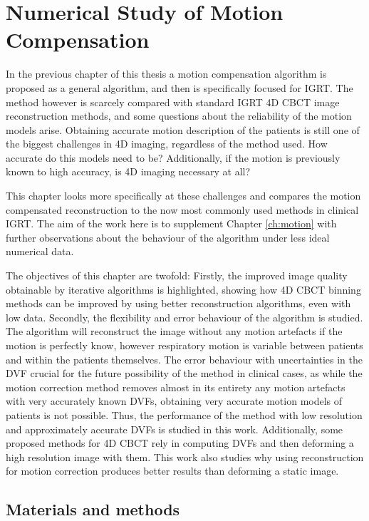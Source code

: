 \chapter{Numerical Study of Motion Compensation}


In the previous chapter of this thesis a motion compensation algorithm is proposed as a general algorithm, and then is specifically focused for IGRT. The method however is scarcely compared with standard IGRT 4D CBCT image reconstruction methods, and some questions about the reliability of the motion models arise. Obtaining accurate motion description of the patients is still one of the biggest challenges in 4D imaging, regardless of the method used. How accurate do this models need to be? Additionally, if the motion is previously known to high accuracy, is 4D imaging necessary at all? 

This chapter looks more specifically at these challenges and compares the motion compensated reconstruction to the now most commonly used methods in clinical IGRT. The aim of the work here is to supplement Chapter \ref{ch:motion} with further observations about the behaviour of the algorithm under less ideal numerical data.

The objectives of this chapter are twofold: Firstly, the improved image quality obtainable by iterative algorithms is highlighted, showing how 4D CBCT binning methods can be improved by using better reconstruction algorithms, even with low data. Secondly, the flexibility and error behaviour of the algorithm is studied. The algorithm will reconstruct the image without any motion artefacts if the motion is perfectly know, however respiratory motion is variable between patients and within the patients themselves. The error behaviour with uncertainties in the DVF crucial for the future possibility of the method in clinical cases, as while the motion correction method removes almost in its entirety any motion artefacts with very accurately known DVFs, obtaining very accurate motion models of patients is not possible. Thus, the performance of the method with low resolution and approximately accurate DVFs is studied in this work. Additionally, some proposed methods for 4D CBCT rely in computing DVFs and then deforming a high resolution image with them. This work also studies why using reconstruction for motion correction produces better results than deforming a static image.



\section{Materials and methods}

